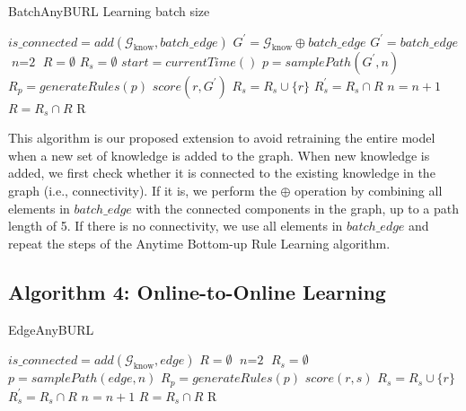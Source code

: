 \begin{algorithm}[H]
	\caption{BatchAnyBURL Learning batch size}
	\label{alg:BatchAnyBURL}
	\begin{algorithmic}[1]
		\State $is\_connected = add(\mathcal{G}_{\text{know}}, batch\_edge)$
		\State  $ G^{\prime} = \mathcal{G}_{\text{know}} \oplus batch\_edge$
		\Else
		\State  $ G^{\prime} = batch\_edge$
		\EndIf
		\State $\textit{n} = \text{2}$
		\State $R = \emptyset$
		\Loop
		\State $R_s = \emptyset$
		\State $start = currentTime()$
		\Repeat
		\State $p = samplePath(G^{\prime}, n)$
		\State $R_p = generateRules(p)$
		\State $score(r, G^{\prime})$
		\State $R_s = R_s \cup \{r\}$
		\EndIf
		\EndFor
		\State $R^{\prime}_s = R_s \cap R$
		\State $n = n + 1$
		\EndIf
		\State $R = R_s \cap R$
		\EndLoop
		\Return R
		\EndProcedure
	\end{algorithmic}
\end{algorithm}

This algorithm is our proposed extension to avoid retraining the entire model when a new set of knowledge is added to the graph. When new knowledge is added, we first check whether it is connected to the existing knowledge in the graph (i.e., connectivity). If it is, we perform the \(\oplus\) operation by combining all elements in \(batch\_edge\) with the connected components in the graph, up to a path length of 5. If there is no connectivity, we use all elements in \(batch\_edge\) and repeat the steps of the Anytime Bottom-up Rule Learning algorithm.



\subsection{Algorithm 4: Online-to-Online Learning}



\begin{algorithm}[H]
	\caption{EdgeAnyBURL}
	\label{alg:EdgeAnyBURL}
	\begin{algorithmic}[1]
		\State $is\_connected = add(\mathcal{G}_{\text{know}}, edge)$
		\State $R = \emptyset$
		\State $\textit{n} = \text{2}$
		\State $R_s = \emptyset$
		\Repeat
		\State $p = samplePath(edge, n)$
		\State $R_p = generateRules(p)$
		\State $score(r, s)$
		\State $R_s = R_s \cup \{r\}$
		\EndIf
		\EndFor
		\State $R^{\prime}_s = R_s \cap R$
		\State $n = n + 1$
		\EndIf
		\State $R = R_s \cap R$
		\EndIf
		\State \Return R
		\EndProcedure
	\end{algorithmic}
\end{algorithm}

